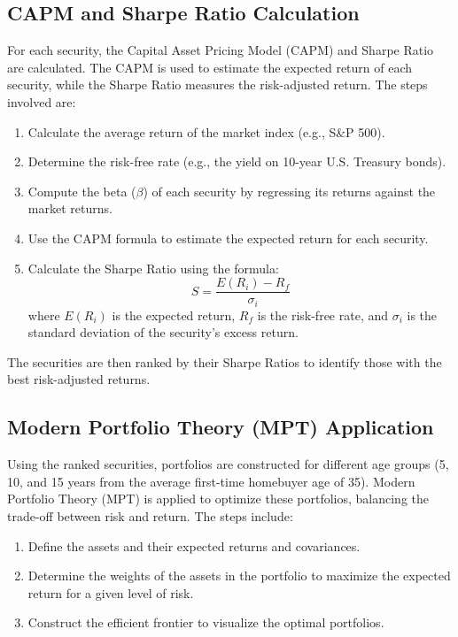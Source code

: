 \subsection{CAPM and Sharpe Ratio Calculation}
For each security, the Capital Asset Pricing Model (CAPM) and Sharpe Ratio are calculated. The CAPM is used to estimate the expected return of each security, while the Sharpe Ratio measures the risk-adjusted return. The steps involved are:
\begin{enumerate}
    \item Calculate the average return of the market index (e.g., S&P 500).
    \item Determine the risk-free rate (e.g., the yield on 10-year U.S. Treasury bonds).
    \item Compute the beta (\(\beta\)) of each security by regressing its returns against the market returns.
    \item Use the CAPM formula to estimate the expected return for each security.
    \item Calculate the Sharpe Ratio using the formula:
    \[ S = \frac{E(R_i) - R_f}{\sigma_i} \]
    where \( E(R_i) \) is the expected return, \( R_f \) is the risk-free rate, and \( \sigma_i \) is the standard deviation of the security's excess return.
\end{enumerate}
The securities are then ranked by their Sharpe Ratios to identify those with the best risk-adjusted returns.

\subsection{Modern Portfolio Theory (MPT) Application}
Using the ranked securities, portfolios are constructed for different age groups (5, 10, and 15 years from the average first-time homebuyer age of 35). Modern Portfolio Theory (MPT) is applied to optimize these portfolios, balancing the trade-off between risk and return. The steps include:
\begin{enumerate}
    \item Define the assets and their expected returns and covariances.
    \item Determine the weights of the assets in the portfolio to maximize the expected return for a given level of risk.
    \item Construct the efficient frontier to visualize the optimal portfolios.
\end{enumerate}

